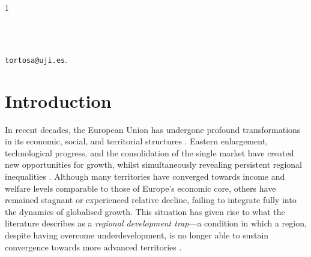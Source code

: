 \documentclass[a4paper,11pt,oneside]{article}
\newcommand{\Emili}{\color{emili}}
\begin{document}
\begin{spacing}{1}
\begin{abstract}
\end{abstract}



\vspace{0.6cm}

\\

\\




\begin{sloppypar}
 \texttt{tortosa@uji.es}.
\end{sloppypar}






\end{spacing}











\pagebreak



\setcounter{page}{1}



\section{Introduction}
\label{sec:intro}


In recent decades, the European Union has undergone profound transformations in its economic, social, and territorial structures \citep{bachtler2017eu,barbero2023improving}. Eastern enlargement, technological progress, and the consolidation of the single market have created new opportunities for growth, whilst simultaneously revealing persistent regional inequalities \citep{cappelen2003impact,iammarino2019regional}. Although many territories have converged towards income and welfare levels comparable to those of Europe's economic core, others have remained stagnant or experienced relative decline, failing to integrate fully into the dynamics of globalised growth. This situation has given rise to what the literature describes as a \textit{regional development trap}---a condition in which a region, despite having overcome underdevelopment, is no longer able to sustain convergence towards more advanced territories \citep{diemer2022regional}.
\end{document}
